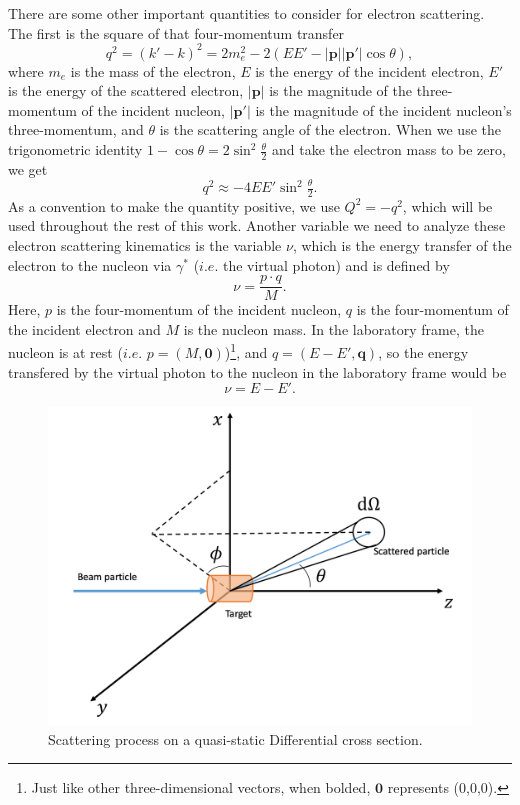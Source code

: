 There are some other important quantities to consider for electron scattering. The first is the square of that four-momentum transfer
\begin{equation}
q^2 = (k' - k)^2 = 2m_e^2 - 2(EE' - |\mathbf{p}||\mathbf{p}'| \cos \theta),
\end{equation}
where $m_e$ is the mass of the electron, $E$ is the energy of the incident electron, $E'$ is the energy of the scattered electron, $|\mathbf{p}|$ is the magnitude of the three-momentum of the incident nucleon, $|\mathbf{p}'|$ is the magnitude of the incident nucleon's three-momentum, and $\theta$ is the scattering angle of the electron. When we use the trigonometric identity $1-\cos \theta = 2 \sin^2 \tfrac{\theta}{2}$ and take the electron mass to be zero, we get
\begin{equation}
q^2 \approx -4EE'\sin^2\tfrac{\theta}{2}.
\end{equation}
As a convention to make the quantity positive, we use $Q^2 = -q^2$, which will be used throughout the rest of this work. Another variable we need to analyze these electron scattering kinematics is the variable $\nu$, which is the energy transfer of the electron to the nucleon via $\gamma^*$ ($i.e.$ the virtual photon) and is defined by
\begin{equation}
\nu = \frac{p \cdot q}{M}.
\end{equation}
Here, $p$ is the four-momentum of the incident nucleon, $q$ is the four-momentum of the incident electron and $M$ is the nucleon mass. In the laboratory frame, the nucleon is at rest ($i.e.$ $p=(M,\mathbf{0})$)\footnote{Just like other three-dimensional vectors, when bolded, $\mathbf{0}$ represents (0,0,0).}, and $q=(E-E',\mathbf{q})$, so the energy transfered by the virtual photon to the nucleon in the laboratory frame would be
\begin{equation}
\nu  = E-E'.
\end{equation}

\begin{figure}[h!]
	\centering
	\includegraphics[width=0.6\linewidth]{figures/diff_xsec.png}
	\caption{Scattering process on a quasi-static Differential cross section.}
	\label{fig:diff_xsec}
\end{figure}

